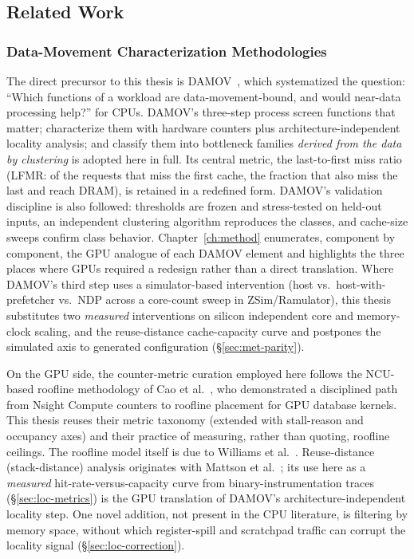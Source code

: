 \subsection{Related Work}
\label{ch:related}

\subsubsection{Data-Movement Characterization Methodologies}

The direct precursor to this thesis is DAMOV~\cite{oliveira2021damov}, which systematized the question: ``Which functions of a workload are data-movement-bound, and would near-data processing help?'' for CPUs. DAMOV's three-step process screen functions that matter; characterize them with hardware counters plus architecture-independent locality analysis; and classify them into bottleneck families \emph{derived from the data by clustering} is adopted here in full. Its central metric, the last-to-first miss ratio (LFMR: of the requests that miss the first cache, the fraction that also miss the last and reach DRAM), is retained in a redefined form. DAMOV's validation discipline is also followed: thresholds are frozen and stress-tested on held-out inputs, an independent clustering algorithm reproduces the classes, and cache-size sweeps confirm class behavior. Chapter~\ref{ch:method} enumerates, component by component, the GPU analogue of each DAMOV element and highlights the three places where GPUs required a redesign rather than a direct translation. Where DAMOV's third step uses a simulator-based intervention (host vs.\ host-with-prefetcher vs.\ NDP across a core-count sweep in ZSim/Ramulator), this thesis substitutes two \emph{measured} interventions on silicon independent core and memory-clock scaling, and the reuse-distance cache-capacity curve and postpones the simulated axis to generated configuration (\S\ref{sec:met-parity}).

On the GPU side, the counter-metric curation employed here follows the NCU-based roofline methodology of Cao et al.~\cite{cao2023gpudb}, who demonstrated a disciplined path from Nsight Compute counters to roofline placement for GPU database kernels. This thesis reuses their metric taxonomy (extended with stall-reason and occupancy axes) and their practice of measuring, rather than quoting, roofline ceilings. The roofline model itself is due to Williams et al.~\cite{williams2009roofline}. Reuse-distance (stack-distance) analysis originates with Mattson et al.~\cite{mattson1970stack}; its use here as a \emph{measured} hit-rate-versus-capacity curve from binary-instrumentation traces (\S\ref{sec:loc-metrics}) is the GPU translation of DAMOV's architecture-independent locality step. One novel addition, not present in the CPU literature, is filtering by memory space, without which register-spill and scratchpad traffic can corrupt the locality signal (\S\ref{sec:loc-correction}).

